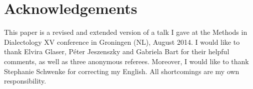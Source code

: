 \documentclass[output=paper]{LSP/langsci}
\begin{document}
\section*{Acknowledgements}
This paper is a revised and extended version of a talk I gave at the Methods in Dialectology XV conference in Groningen (NL), August 2014. I would like to thank Elvira Glaser, Péter Jeszenszky and Gabriela Bart for their helpful comments, as well as three anonymous referees. Moreover, I would like to thank Stephanie Schwenke for correcting my English. All shortcomings are my own responsibility.

\printbibliography[heading=subbibliography,notkeyword=this]
\end{document}

